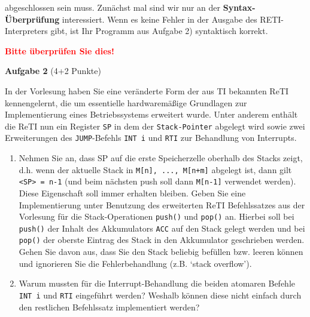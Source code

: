 \documentclass{article}
\begin{document}
abgeschlossen sein muss.
Zunächst mal sind wir nur an der \textbf{Syntax-Überprüfung} interessiert. Wenn es keine Fehler in der Ausgabe des RETI-Interpreters gibt, ist Ihr Programm aus Aufgabe 2) syntaktisch korrekt.

\textbf{\textcolor{red}{Bitte überprüfen Sie dies!}}

\textbf{Aufgabe 2} (4+2 Punkte)

In der Vorlesung haben Sie eine veränderte Form der aus TI bekannten ReTI kennengelernt, die um essentielle hardwaremäßige Grundlagen zur Implementierung eines Betriebssystems erweitert wurde. Unter anderem enthält die ReTI nun ein Register \verb|SP| in dem der \verb|Stack-Pointer| abgelegt wird sowie zwei Erweiterungen des \verb|JUMP|-Befehls \verb|INT i| und \verb|RTI| zur Behandlung von Interrupts.

\begin{enumerate}[label=\alph*)]
	\item Nehmen Sie an, dass SP auf die erste Speicherzelle oberhalb des Stacks zeigt, d.h. wenn der aktuelle Stack in \verb|M[n], ..., M[n+m]| abgelegt ist, dann gilt \verb|<SP> = n-1| (und beim nächsten push soll dann \verb|M[n-1]| verwendet werden). Diese Eigenschaft soll immer erhalten bleiben. Geben Sie eine Implementierung unter Benutzung des erweiterten ReTI Befehlssatzes aus der Vorlesung für die Stack-Operationen \verb|push()| und \verb|pop()| an. Hierbei soll bei \verb|push()| der Inhalt des Akkumulators \verb|ACC| auf den Stack gelegt werden und bei \verb|pop()| der oberste Eintrag des Stack in den Akkumulator geschrieben werden. Gehen Sie davon aus, dass Sie den Stack beliebig befüllen bzw. leeren können und ignorieren Sie die Fehlerbehandlung (z.B. ‘stack overflow’).
	\item Warum mussten für die Interrupt-Behandlung die beiden atomaren Befehle \verb|INT i| und \verb|RTI| eingeführt werden? Weshalb können diese nicht einfach durch den restlichen Befehlssatz implementiert werden?
\end{enumerate}
\end{document}

